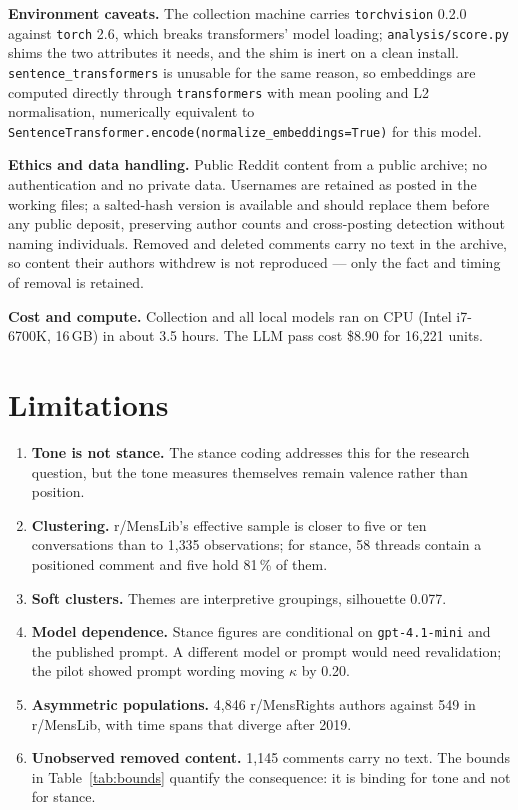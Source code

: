 \documentclass[11pt,a4paper]{article}
\newcommand{\code}[1]{\texttt{\small #1}}
\begin{document}
\textbf{Environment caveats.} The collection machine carries \code{torchvision} 0.2.0 against
\code{torch} 2.6, which breaks transformers' model loading; \code{analysis/score.py} shims the two
attributes it needs, and the shim is inert on a clean install. \code{sentence\_transformers} is
unusable for the same reason, so embeddings are computed directly through \code{transformers} with
mean pooling and L2 normalisation, numerically equivalent to
\code{SentenceTransformer.encode(normalize\_embeddings=True)} for this model.

\textbf{Ethics and data handling.} Public Reddit content from a public archive; no authentication
and no private data. Usernames are retained as posted in the working files; a salted-hash version
is available and should replace them before any public deposit, preserving author counts and
cross-posting detection without naming individuals. Removed and deleted comments carry no text in
the archive, so content their authors withdrew is not reproduced --- only the fact and timing of
removal is retained.

\textbf{Cost and compute.} Collection and all local models ran on CPU (Intel i7-6700K, 16\,GB) in
about 3.5 hours. The LLM pass cost \$8.90 for 16{,}221 units.

\section{Limitations}

\begin{enumerate}
\item \textbf{Tone is not stance.} The stance coding addresses this for the research question, but
the tone measures themselves remain valence rather than position.
\item \textbf{Clustering.} r/MensLib's effective sample is closer to five or ten conversations than
to 1{,}335 observations; for stance, 58 threads contain a positioned comment and five hold 81\,\% of
them.
\item \textbf{Soft clusters.} Themes are interpretive groupings, silhouette 0.077.
\item \textbf{Model dependence.} Stance figures are conditional on \code{gpt-4.1-mini} and the
published prompt. A different model or prompt would need revalidation; the pilot showed prompt
wording moving $\kappa$ by 0.20.
\item \textbf{Asymmetric populations.} 4{,}846 r/MensRights authors against 549 in r/MensLib, with
time spans that diverge after 2019.
\item \textbf{Unobserved removed content.} 1{,}145 comments carry no text. The bounds in Table~\ref{tab:bounds}
quantify the consequence: it is binding for tone and not for stance.
\end{enumerate}
\end{document}
